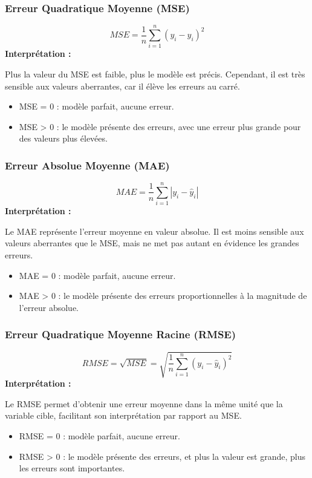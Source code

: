 \subsubsection{Erreur Quadratique Moyenne (MSE)}
\begin{equation}
MSE = \frac{1}{n} \sum_{i=1}^{n} (y_i - \hat{y}_i)^2
\end{equation}
\textbf{Interprétation :} 

Plus la valeur du MSE est faible, plus le modèle est précis. Cependant, il est très sensible aux valeurs aberrantes, car il élève les erreurs au carré.
\begin{itemize}
	\item MSE = 0 : modèle parfait, aucune erreur.
	\item MSE > 0 : le modèle présente des erreurs, avec une erreur plus grande pour des valeurs plus élevées.
\end{itemize}

\subsubsection{Erreur Absolue Moyenne (MAE)}
\begin{equation}
MAE = \frac{1}{n} \sum_{i=1}^{n} |y_i - \hat{y}_i|
\end{equation}
\textbf{Interprétation :} 

Le MAE représente l'erreur moyenne en valeur absolue. Il est moins sensible aux valeurs aberrantes que le MSE, mais ne met pas autant en évidence les grandes erreurs.
\begin{itemize}
	\item MAE = 0 : modèle parfait, aucune erreur.
	\item MAE > 0 : le modèle présente des erreurs proportionnelles à la magnitude de l'erreur absolue.
\end{itemize}

\subsubsection{Erreur Quadratique Moyenne Racine (RMSE)}
\begin{equation}
RMSE = \sqrt{MSE} = \sqrt{\frac{1}{n} \sum_{i=1}^{n} (y_i - \hat{y}_i)^2}
\end{equation}
\textbf{Interprétation :} 

Le RMSE permet d'obtenir une erreur moyenne dans la même unité que la variable cible, facilitant son interprétation par rapport au MSE.
\begin{itemize}
	\item RMSE = 0 : modèle parfait, aucune erreur.
	\item RMSE > 0 : le modèle présente des erreurs, et plus la valeur est grande, plus les erreurs sont importantes.
\end{itemize}

